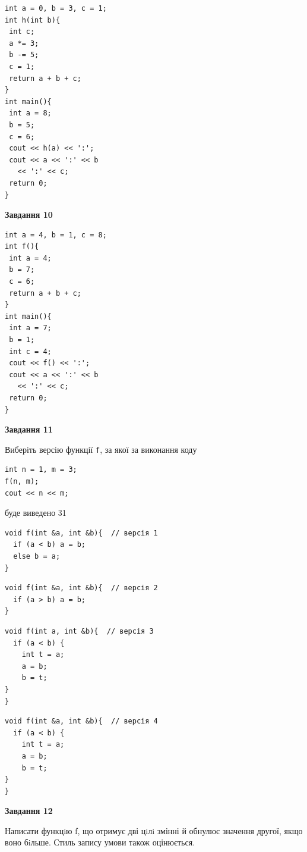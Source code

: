 \documentclass[12pt, ukrainian]{article}
\def\code#1{\Verb!#1!}
\begin{document}
{\begin {large}
\begin{minipage}[t]{7.0cm}
\begin{verbatim}
int a = 0, b = 3, c = 1;
int h(int b){
 int c;
 a *= 3;
 b -= 5;
 c = 1;
 return a + b + c;
}
int main(){
 int a = 8;
 b = 5;
 c = 6;
 cout << h(a) << ':';
 cout << a << ':' << b 
   << ':' << c;
 return 0;
}
\end{verbatim}



\begin{center}
\textbf{Завдання 10}
\end{center}
\vspace{-8mm}

\begin{verbatim}
int a = 4, b = 1, c = 8;
int f(){
 int a = 4;
 b = 7;
 c = 6;
 return a + b + c;
}
int main(){
 int a = 7;
 b = 1;
 int c = 4;
 cout << f() << ':';
 cout << a << ':' << b 
   << ':' << c;
 return 0;
}
\end{verbatim}

\end{minipage}
\vline \hspace{1mm}
\begin{minipage}[t]{11.0cm}

\begin{center}
\textbf{Завдання 11}
\end{center}
Виберіть версію функції \code{f}, за якої за виконання коду
\begin{verbatim}
int n = 1, m = 3;
f(n, m);
cout << n << m;
\end{verbatim}

буде виведено 31

\begin{verbatim}
void f(int &a, int &b){  // версія 1
  if (a < b) a = b;
  else b = a;
}
\end{verbatim}

\vspace{-8mm}\begin{verbatim}
void f(int &a, int &b){  // версія 2
  if (a > b) a = b;
}
\end{verbatim}

\vspace{-8mm}\begin{verbatim}
void f(int a, int &b){  // версія 3
  if (a < b) {
    int t = a;
    a = b;
    b = t;
}  
}
\end{verbatim}

\vspace{-8mm}\begin{verbatim}
void f(int &a, int &b){  // версія 4
  if (a < b) {
    int t = a;
    a = b;
    b = t;
}  
}
\end{verbatim}



\begin{center}
\textbf{Завдання 12}
\end{center}

Написати функцiю f, що отримує дві цiлi змінні й обнулює значення другої, якщо воно бiльше. Стиль запису умови також оцінюється.\par

\end{minipage}

\end {large}}
\end{document}
